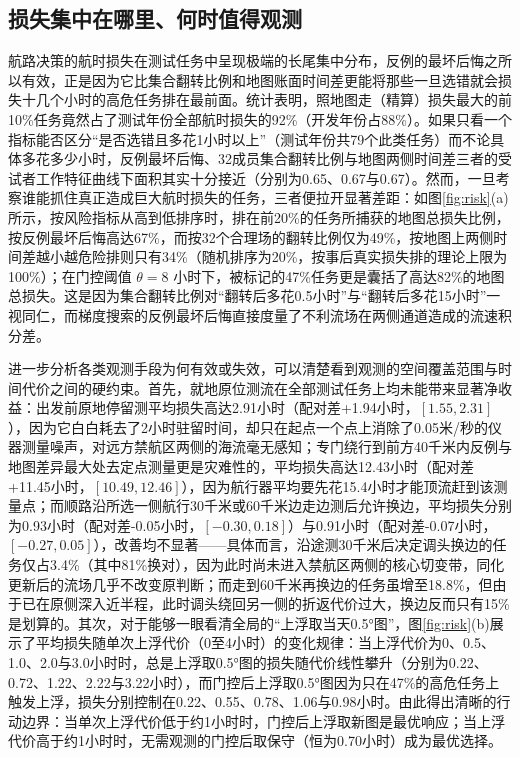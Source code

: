 \subsection{损失集中在哪里、何时值得观测}
航路决策的航时损失在测试任务中呈现极端的长尾集中分布，反例的最坏后悔之所以有效，正是因为它比集合翻转比例和地图账面时间差更能将那些一旦选错就会损失十几个小时的高危任务排在最前面。统计表明，照地图走（精算）损失最大的前10\%任务竟然占了测试年份全部航时损失的92\%（开发年份占88\%）。如果只看一个指标能否区分“是否选错且多花1小时以上”（测试年份共79个此类任务）而不论具体多花多少小时，反例最坏后悔、32成员集合翻转比例与地图两侧时间差三者的受试者工作特征曲线下面积其实十分接近（分别为0.65、0.67与0.67）。然而，一旦考察谁能抓住真正造成巨大航时损失的任务，三者便拉开显著差距：如图\ref{fig:risk}(a)所示，按风险指标从高到低排序时，排在前20\%的任务所捕获的地图总损失比例，按反例最坏后悔高达67\%，而按32个合理场的翻转比例仅为49\%，按地图上两侧时间差越小越危险排则只有34\%（随机排序为20\%，按事后真实损失排的理论上限为100\%）；在门控阈值 $\theta=8$ 小时下，被标记的47\%任务更是囊括了高达82\%的地图总损失。这是因为集合翻转比例对“翻转后多花0.5小时”与“翻转后多花15小时”一视同仁，而梯度搜索的反例最坏后悔直接度量了不利流场在两侧通道造成的流速积分差。

进一步分析各类观测手段为何有效或失效，可以清楚看到观测的空间覆盖范围与时间代价之间的硬约束。首先，就地原位测流在全部测试任务上均未能带来显著净收益：出发前原地停留测平均损失高达2.91小时（配对差+1.94小时，$[1.55, 2.31]$），因为它白白耗去了2小时驻留时间，却只在起点一个点上消除了0.05米/秒的仪器测量噪声，对远方禁航区两侧的海流毫无感知；专门绕行到前方40千米内反例与地图差异最大处去定点测量更是灾难性的，平均损失高达12.43小时（配对差+11.45小时，$[10.49, 12.46]$），因为航行器平均要先花15.4小时才能顶流赶到该测量点；而顺路沿所选一侧航行30千米或60千米边走边测后允许换边，平均损失分别为0.93小时（配对差-0.05小时，$[-0.30, 0.18]$）与0.91小时（配对差-0.07小时，$[-0.27, 0.05]$），改善均不显著——具体而言，沿途测30千米后决定调头换边的任务仅占3.4\%（其中81\%换对），因为此时尚未进入禁航区两侧的核心切变带，同化更新后的流场几乎不改变原判断；而走到60千米再换边的任务虽增至18.8\%，但由于已在原侧深入近半程，此时调头绕回另一侧的折返代价过大，换边反而只有15\%是划算的。其次，对于能够一眼看清全局的“上浮取当天0.5°图”，图\ref{fig:risk}(b)展示了平均损失随单次上浮代价（0至4小时）的变化规律：当上浮代价为0、0.5、1.0、2.0与3.0小时时，总是上浮取0.5°图的损失随代价线性攀升（分别为0.22、0.72、1.22、2.22与3.22小时），而门控后上浮取0.5°图因为只在47\%的高危任务上触发上浮，损失分别控制在0.22、0.55、0.78、1.06与0.98小时。由此得出清晰的行动边界：当单次上浮代价低于约1小时时，门控后上浮取新图是最优响应；当上浮代价高于约1小时时，无需观测的门控后取保守（恒为0.70小时）成为最优选择。

